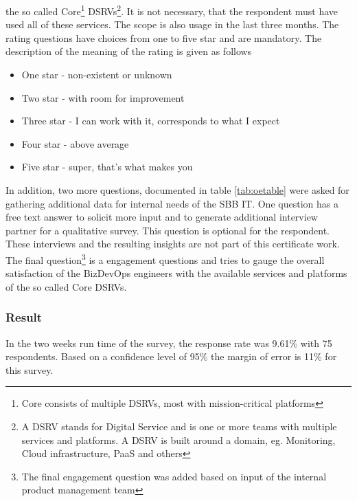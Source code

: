 \documentclass[a4paper,12pt]{article}
\begin{document}
    the so called Core\footnote{Core consists of multiple DSRVs, most with mission-critical platforms} DSRVs\footnote{
        A DSRV stands for Digital Service and is one or more teams with multiple services and platforms. A DSRV is built
        around a domain, eg. Monitoring,        Cloud infrastructure, PaaS and others}.
    It is not necessary, that the respondent must have used all of these services.
    The scope is also usage in the last three months.
    The rating questions have choices from one to five star and are mandatory.
    The description of the meaning of the rating is given as follows
    \begin{itemize}
        \item One star - non-existent or unknown
        \item Two star - with room for improvement
        \item Three star - I can work with it, corresponds to what I expect
        \item Four star - above average
        \item Five star - super, that's what makes you
    \end{itemize}

    In addition, two more questions, documented in table \ref{tab:oetable} were asked for gathering additional data for
    internal needs of the SBB IT.
    One question has a free text answer to solicit more input and to generate additional interview partner
    for a qualitative survey.
    This question is optional for the respondent.
    These interviews and the resulting insights are not part of this certificate work.
    The final question\footnote{The final engagement question was added based on input of the internal product management team}
    is a engagement questions and tries to gauge the overall satisfaction of the BizDevOps engineers
    with the available services and platforms of the so called Core DSRVs.

    \subsubsection{Result}
    In the two weeks run time of the survey, the response rate was 9.61\% with 75 respondents.
    Based on a confidence level of 95\% the margin of error is 11\% for this survey.
\end{document}
